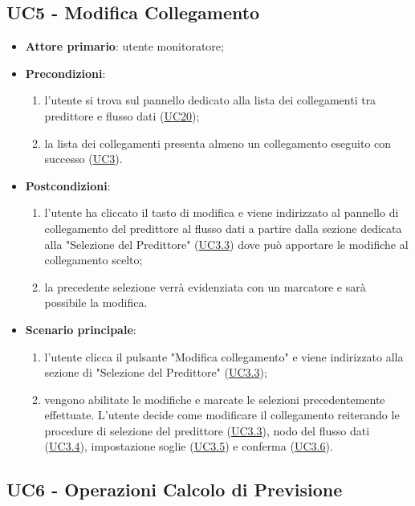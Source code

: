 	\label{par:UC5}
	\subsection{UC5 - Modifica Collegamento}

		\begin{itemize}
			\item\textbf{Attore primario}: utente monitoratore;
			\item\textbf{Precondizioni}:
				\begin{enumerate}
					\item l'utente si trova sul pannello dedicato alla lista dei collegamenti tra predittore e flusso dati (\hyperref[par:UC20]{UC20});
					\item la lista dei collegamenti presenta almeno un collegamento eseguito con successo (\hyperref[par:UC3]{UC3}).
				\end{enumerate}
			\item\textbf{Postcondizioni}:
				\begin{enumerate}
					\item l’utente ha cliccato il tasto di modifica e viene indirizzato al pannello di collegamento del predittore al flusso dati a partire dalla sezione dedicata alla "Selezione del Predittore" (\hyperref[par:UC3.3]{UC3.3}) dove può apportare le modifiche al collegamento scelto;
					\item la precedente selezione verrà evidenziata con un marcatore e sarà possibile la modifica.
				\end{enumerate}
			\item\textbf{Scenario principale}:
				\begin{enumerate}
					\item l'utente clicca il pulsante "Modifica collegamento" e viene indirizzato alla sezione di "Selezione del Predittore" (\hyperref[par:UC3.3]{UC3.3});
					\item vengono abilitate le modifiche e marcate le selezioni precedentemente effettuate. L'utente decide come modificare il collegamento reiterando le procedure di selezione del predittore (\hyperref[par:UC3.3]{UC3.3}), nodo del flusso dati (\hyperref[par:UC3.4]{UC3.4}), impostazione soglie (\hyperref[par:UC3.5]{UC3.5}) e conferma (\hyperref[par:UC3.6]{UC3.6}).
				\end{enumerate}		
		\end{itemize}



	\label{par:UC6}
	\subsection{UC6 - Operazioni Calcolo di Previsione}

